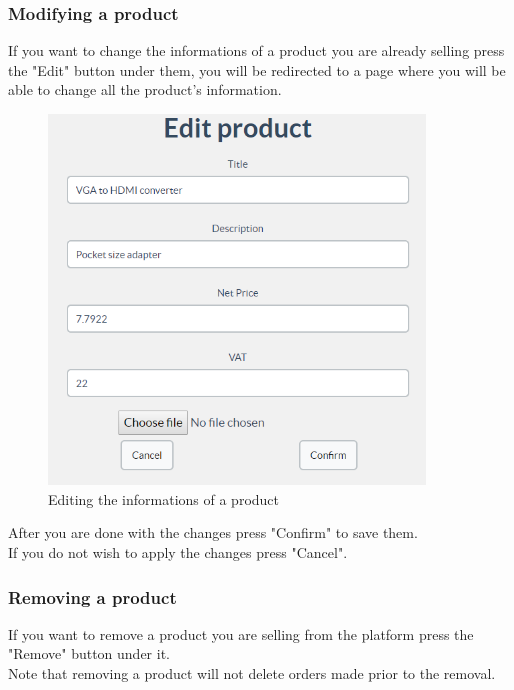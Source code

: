 		\subsubsection{Modifying a product}
		If you want to change the informations of a product you are already 
		selling press the "Edit" button under them, you will be redirected to a 
		page where you will be able to change all the product's information.
	\begin{figure}[H]
		\includegraphics[width=10cm]{res/images/edit_product.png}
		\centering
		\caption{Editing the informations of a product}
	\end{figure}
	\noindent After you are done with the changes press "Confirm" to save them.
	\\If you do not wish to apply the changes press "Cancel".
	
		\subsubsection{Removing a product}
		If you want to remove a product you are selling from the platform press 
		the	"Remove" button under it.
		\\Note that removing a product will not delete orders made prior to the 
		removal. 
	
